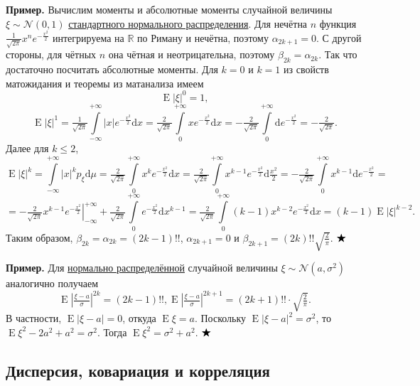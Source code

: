 \documentclass[12pt]{article}
\numberwithin{theorem}{section}
\theoremstyle{definition}
\newenvironment{example}{\indent \textbf{Пример.}}{$ \hfill \bigstar $}
\newcommand{\RR}{\mathbb{R}}
\newcommand{\expect}{\operatorname{E}}
\newcommand{\diff}{\mathrm{d}}
\begin{document}
	\begin{example}
		Вычислим моменты и абсолютные моменты случайной величины $ \xi \sim \mathcal{N}(0, 1) $ 
		\hyperlink{standard-normal-distribution}{стандартного нормального распределения}.
		Для нечётна $ n $ функция $ \tfrac{1}{\sqrt{2\pi}} x^n e^{-\tfrac{x^2}{2}} $
		интегрируема на $ \RR $ по Риману и нечётна, поэтому
		$ \alpha_{2k + 1} = 0 $.
		С другой стороны, для чётных $ n $ она чётная и неотрицательна, поэтому $ \beta_{2k} = \alpha_{2k} $.
		Так что достаточно посчитать абсолютные моменты.
		Для $ k = 0 $ и $ k = 1 $ из свойств матожидания и теоремы из матанализа имеем
		$$ \expect|\xi|^0 = 1, $$ 
		$$ \expect|\xi|^1 = \tfrac{1}{\sqrt{2\pi}} \int\limits_{-\infty}^{+\infty} |x|e^{-\tfrac{x^2}{2}} \diff x 
		= \tfrac{2}{\sqrt{2\pi}} \int\limits_{0}^{+\infty} xe^{-\tfrac{x^2}{2}} \diff x
		= -\tfrac{2}{\sqrt{2\pi}} \int\limits_{0}^{+\infty} \diff e^{-\tfrac{x^2}{2}}
		= -\tfrac{2}{\sqrt{2\pi}}. $$
		Далее для $ k \leqslant 2 $,
		$$ \expect|\xi|^k = \int\limits_{-\infty}^{+\infty} |x|^k p_\xi \diff\mu
		= \tfrac{2}{\sqrt{2\pi}} \int\limits_{0}^{+\infty} x^k e^{-\tfrac{x^2}{2}} \diff x
		= \tfrac{2}{\sqrt{2\pi}} \int\limits_{0}^{+\infty} x^{k - 1} e^{-\tfrac{x^2}{2}} \diff \tfrac{x^2}{2}
		= - \tfrac{2}{\sqrt{2\pi}} \int\limits_{0}^{+\infty} x^{k - 1} \diff e^{-\tfrac{x^2}{2}} = $$
		$$ = \left.-\tfrac{2}{\sqrt{2\pi}}x^{k - 1}e^{-\tfrac{x^2}{2}}\right|_{-\infty}^{+\infty}
		+ \tfrac{2}{\sqrt{2\pi}} \int\limits_{0}^{+\infty} e^{-\tfrac{x^2}{2}} \diff x^{k - 1}
		= \tfrac{2}{\sqrt{2\pi}} \int\limits_{0}^{+\infty} (k - 1)x^{k - 2} e^{-\tfrac{x^2}{2}} \diff x
		= (k - 1)\expect|\xi|^{k - 2}. $$
		Таким образом, $ \beta_{2k} = \alpha_{2k} = (2k - 1)!! $, $ \alpha_{2k + 1} = 0 $
		и $ \beta_{2k + 1} = (2k)!! \sqrt{\tfrac{2}{\pi}} $. 
	\end{example}
	
	\begin{example}
		Для \hyperlink{normal-distribution}{нормально распределённой} 
		случайной величины $ \xi \sim \mathcal{N}(a, \sigma^2) $
		аналогично получаем
		$$ \expect|\tfrac{\xi - a}{\sigma}|^{2k} = (2k - 1)!!, 
		\expect|\tfrac{\xi - a}{\sigma}|^{2k + 1} = (2k + 1)!! \cdot \sqrt{\tfrac{2}{\pi}}. $$
		В частности, $ \expect|\xi - a| = 0 $, откуда $ \expect\xi = a $.
		Поскольку $ \expect|\xi - a|^2 = \sigma^2 $,
		то $ \expect\xi^2 - 2a^2 + a^2 = \sigma^2 $.
		Тогда $ \expect\xi^2 = \sigma^2 + a^2 $.
	\end{example}
	
	\subsection{Дисперсия, ковариация и корреляция}
	
\end{document}
